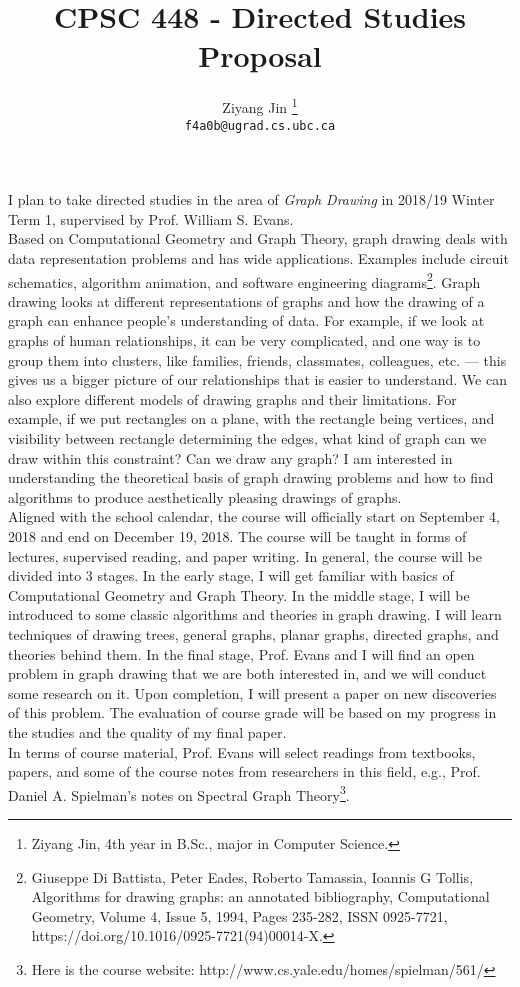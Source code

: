 \documentclass[11pt,letterpaper]{article}
\title{CPSC 448 - Directed Studies Proposal}
\author{Ziyang Jin \thanks{Ziyang Jin, 4th year in B.Sc., major in Computer Science.} \\ \texttt{f4a0b@ugrad.cs.ubc.ca}}
\date{}
\begin{document}
\maketitle

I plan to take directed studies in the area of \textit{Graph Drawing} in 2018/19 Winter Term 1, supervised by Prof. William S. Evans.\\

Based on Computational Geometry and Graph Theory, graph drawing deals with data representation problems and has wide applications. Examples include circuit schematics, algorithm animation, and software engineering diagrams\footnote{Giuseppe Di Battista, Peter Eades, Roberto Tamassia, Ioannis G Tollis, Algorithms for drawing graphs: an annotated bibliography, Computational Geometry, Volume 4, Issue 5, 1994, Pages 235-282, ISSN 0925-7721, https://doi.org/10.1016/0925-7721(94)00014-X.}. Graph drawing looks at different representations of graphs and how the drawing of a graph can enhance people's understanding of data. For example, if we look at graphs of human relationships, it can be very complicated, and one way is to group them into clusters, like families, friends, classmates, colleagues, etc. --- this gives us a bigger picture of our relationships that is easier to understand. We can also explore different models of drawing graphs and their limitations. For example, if we put rectangles on a plane, with the rectangle being vertices, and visibility between rectangle determining the edges, what kind of graph can we draw within this constraint? Can we draw any graph? I am interested in understanding the theoretical basis of graph drawing problems and how to find algorithms to produce aesthetically pleasing drawings of graphs.\\

Aligned with the school calendar, the course will officially start on September 4, 2018 and end on December 19, 2018. The course will be taught in forms of lectures, supervised reading, and paper writing. In general, the course will be  divided into 3 stages. In the early stage, I will get familiar with basics of Computational Geometry and Graph Theory. In the middle stage, I will be introduced to some classic algorithms and theories in graph drawing. I will learn techniques of drawing trees, general graphs, planar graphs, directed graphs, and theories behind them. In the final stage, Prof. Evans and I will find an open problem in graph drawing that we are both interested in, and we will conduct some research on it. Upon completion, I will present a paper on new discoveries of this problem. The evaluation of course grade will be based on my progress in the studies and the quality of my final paper.\\

In terms of course material, Prof. Evans will select readings from textbooks, papers, and some of the course notes from researchers in this field, e.g., Prof. Daniel A. Spielman's notes on Spectral Graph Theory\footnote{Here is the course website: http://www.cs.yale.edu/homes/spielman/561/}.
\end{document}
